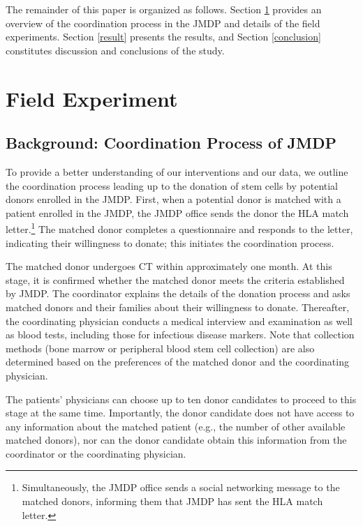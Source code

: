 \documentclass[12pt, a4paper]{article}
\begin{document}
The remainder of this paper is organized as follows. Section \ref{experiment} provides an overview of the coordination process in the JMDP and details of the field experiments. Section \ref{result} presents the results, and Section \ref{conclusion} constitutes discussion and conclusions of the study.

\hypertarget{experiment}{%
\section{Field Experiment}\label{experiment}}

\hypertarget{background}{%
\subsection{Background: Coordination Process of JMDP}\label{background}}

To provide a better understanding of our interventions and our data, we outline the coordination process leading up to the donation of stem cells by potential donors enrolled in the JMDP. First, when a potential donor is matched with a patient enrolled in the JMDP, the JMDP office sends the donor the HLA match letter.\footnote{Simultaneously, the JMDP office sends a social networking message to the matched donors, informing them that JMDP has sent the HLA match letter.} The matched donor completes a questionnaire and responds to the letter, indicating their willingness to donate; this initiates the coordination process.

The matched donor undergoes CT within approximately one month. At this stage, it is confirmed whether the matched donor meets the criteria established by JMDP. The coordinator explains the details of the donation process and asks matched donors and their families about their willingness to donate. Thereafter, the coordinating physician conducts a medical interview and examination as well as blood tests, including those for infectious disease markers. Note that collection methods (bone marrow or peripheral blood stem cell collection) are also determined based on the preferences of the matched donor and the coordinating physician.

The patients' physicians can choose up to ten donor candidates to proceed to this stage at the same time. Importantly, the donor candidate does not have access to any information about the matched patient (e.g., the number of other available matched donors), nor can the donor candidate obtain this information from the coordinator or the coordinating physician.
\end{document}
